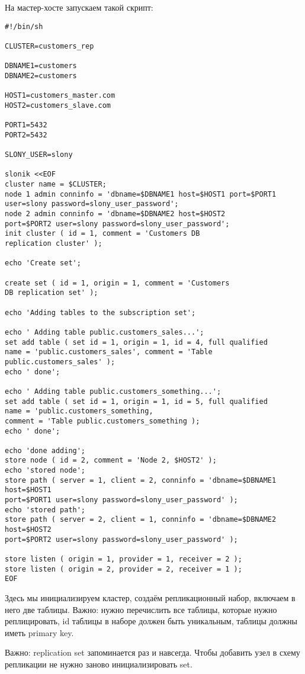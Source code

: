 На мастер-хосте запускаем такой скрипт:
\begin{lstlisting}[label=lst:slony9,caption=Инициализация кластера]
#!/bin/sh

CLUSTER=customers_rep

DBNAME1=customers
DBNAME2=customers

HOST1=customers_master.com
HOST2=customers_slave.com

PORT1=5432
PORT2=5432

SLONY_USER=slony

slonik <<EOF
cluster name = $CLUSTER;
node 1 admin conninfo = 'dbname=$DBNAME1 host=$HOST1 port=$PORT1
user=slony password=slony_user_password';
node 2 admin conninfo = 'dbname=$DBNAME2 host=$HOST2
port=$PORT2 user=slony password=slony_user_password';
init cluster ( id = 1, comment = 'Customers DB
replication cluster' );

echo 'Create set';

create set ( id = 1, origin = 1, comment = 'Customers
DB replication set' );

echo 'Adding tables to the subscription set';

echo ' Adding table public.customers_sales...';
set add table ( set id = 1, origin = 1, id = 4, full qualified
name = 'public.customers_sales', comment = 'Table public.customers_sales' );
echo ' done';

echo ' Adding table public.customers_something...';
set add table ( set id = 1, origin = 1, id = 5, full qualified
name = 'public.customers_something,
comment = 'Table public.customers_something );
echo ' done';

echo 'done adding';
store node ( id = 2, comment = 'Node 2, $HOST2' );
echo 'stored node';
store path ( server = 1, client = 2, conninfo = 'dbname=$DBNAME1 host=$HOST1
port=$PORT1 user=slony password=slony_user_password' );
echo 'stored path';
store path ( server = 2, client = 1, conninfo = 'dbname=$DBNAME2 host=$HOST2
port=$PORT2 user=slony password=slony_user_password' );

store listen ( origin = 1, provider = 1, receiver = 2 );
store listen ( origin = 2, provider = 2, receiver = 1 );
EOF
\end{lstlisting}

Здесь мы инициализируем кластер, создаём репликационный набор, включаем в него две таблицы.
Важно: нужно перечислить все таблицы, которые нужно реплицировать, id таблицы в наборе должен быть уникальным,
таблицы должны иметь primary key.

Важно: replication set запоминается раз и навсегда. Чтобы добавить узел в схему репликации не нужно заново инициализировать set.

